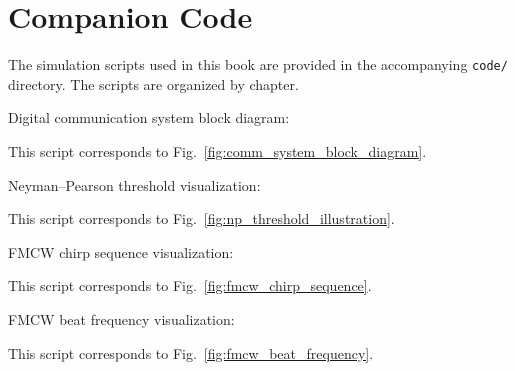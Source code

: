 
\chapter*{Companion Code}

The simulation scripts used in this book are provided in the accompanying
\texttt{code/} directory.
The scripts are organized by chapter.


\noindent
Digital communication system block diagram:

\noindent
This script corresponds to Fig.~\ref{fig:comm_system_block_diagram}.

\medskip

\noindent
Neyman--Pearson threshold visualization:

\noindent
This script corresponds to Fig.~\ref{fig:np_threshold_illustration}.

\medskip

\noindent
FMCW chirp sequence visualization:

\noindent
This script corresponds to Fig.~\ref{fig:fmcw_chirp_sequence}.

\medskip

\noindent
FMCW beat frequency visualization:

\noindent
This script corresponds to Fig.~\ref{fig:fmcw_beat_frequency}.
